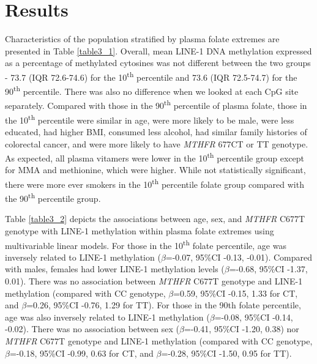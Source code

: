 \section[]{Results} %
\noindent Characteristics of the population stratified by plasma folate extremes are presented in Table \ref{table3_1}. Overall, mean LINE-1 DNA methylation expressed as a percentage of methylated cytosines was not different between the two groups - 73.7 (IQR 72.6-74.6) for the 10\textsuperscript{th} percentile and 73.6 (IQR 72.5-74.7) for the 90\textsuperscript{th} percentile. There was also no difference when we looked at each CpG site separately. Compared with those in the 90\textsuperscript{th} percentile of plasma folate, those in the 10\textsuperscript{th} percentile were similar in age, were more likely to be male, were less educated, had higher BMI, consumed less alcohol, had similar family histories of colorectal cancer, and were more likely to have \emph{MTHFR} 677CT or TT genotype. As expected, all plasma vitamers were lower in the 10\textsuperscript{th} percentile group except for MMA and methionine, which were higher. While not statistically significant, there were more ever smokers in the 10\textsuperscript{th} percentile folate group compared with the 90\textsuperscript{th} percentile group.

\noindent Table \ref{table3_2} depicts the associations between age, sex, and \emph{MTHFR} C677T genotype with LINE-1 methylation within plasma folate extremes using multivariable linear models. For those in the 10\textsuperscript{th} folate percentile, age was inversely related to LINE-1 methylation ($\beta$=-0.07, 95\%CI -0.13, -0.01). Compared with males, females had lower LINE-1 methylation levels ($\beta$=-0.68, 95\%CI -1.37, 0.01). There was no association between \emph{MTHFR} C677T genotype and LINE-1 methylation (compared with CC genotype, $\beta$=0.59, 95\%CI -0.15, 1.33 for CT, and $\beta$=0.26, 95\%CI -0.76, 1.29 for TT). For those in the 90th folate percentile, age was also inversely related to LINE-1 methylation ($\beta$=-0.08, 95\%CI -0.14, -0.02). There was no association between sex ($\beta$=-0.41, 95\%CI -1.20, 0.38) nor \emph{MTHFR} C677T genotype and LINE-1 methylation (compared with CC genotype, $\beta$=-0.18, 95\%CI -0.99, 0.63 for CT, and $\beta$=-0.28, 95\%CI -1.50, 0.95 for TT). 


